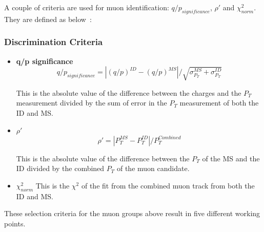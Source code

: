 A couple of criteria are used for muon identification: $q/p_{significance}$, $\rho'$ and $\chi^{2}_{norm}$. They are defined as below~\cite{muonReco2016}:

\subsubsection*{Discrimination Criteria}
\begin{itemize}

\item \textbf{q/p significance}
    \begin{equation}
    q/p_{significance} = |(q/p)^{ID} - (q/p)^{MS}|/\sqrt{\sigma^{MS}_{P_{T}} + \sigma^{ID}_{P_{T}}}
    \end{equation}

This is the absolute value of the difference between the charges and the $P_{T}$ measurement divided by the sum of error in the $P_{T}$ measurement of both the ID and MS.

\item \textbf{$\rho'$}
    \begin{equation}
    \rho' = |P_{T}^{MS} - P_{T}^{ID}| / P_{T}^{Combined}
    \end{equation}

This is the absolute value of the difference between the $P_{T}$ of the MS and the ID divided by the combined $P_{T}$ of the muon candidate.

\item \textbf{$\chi_{norm}^{2}$}
    This is the $\chi^{2}$ of the fit from the combined muon track from both the ID and MS.

\end{itemize}

These selection criteria for the muon groups above result in five different working points.

